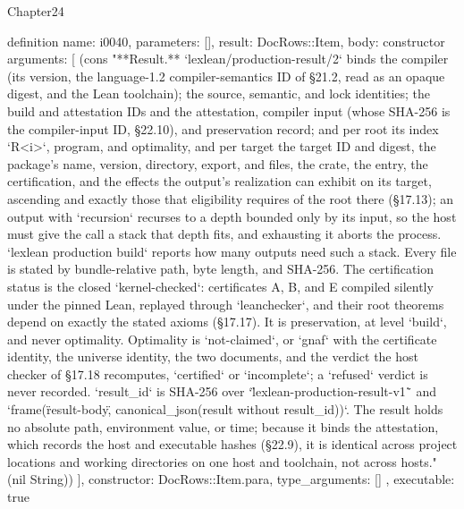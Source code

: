 \begin{lexlean}{Chapter24}
\begin{semanticmodule}
definition{
  name: i0040,
  parameters: [],
  result: DocRows::Item,
  body: constructor{
    arguments: [
      (cons "**Result.** `lexlean/production-result/2` binds the compiler (its version, the language-1.2 compiler-semantics ID of §21.2, read as an opaque digest, and the Lean toolchain); the source, semantic, and lock identities; the build and attestation IDs and the attestation, compiler input (whose SHA-256 is the compiler-input ID, §22.10), and preservation record; and per root its index `R<i>`, program, and optimality, and per target the target ID and digest, the package's name, version, directory, export, and files, the crate, the entry, the certification, and the effects the output's realization can exhibit on its target, ascending and exactly those that eligibility requires of the root there (§17.13); an output with `recursion` recurses to a depth bounded only by its input, so the host must give the call a stack that depth fits, and exhausting it aborts the process. `lexlean production build` reports how many outputs need such a stack. Every file is stated by bundle-relative path, byte length, and SHA-256. The certification status is the closed `kernel-checked`: certificates A, B, and E compiled silently under the pinned Lean, replayed through `leanchecker`, and their root theorems depend on exactly the stated axioms (§17.17). It is preservation, at level `build`, and never optimality. Optimality is `not-claimed`, or `gnaf` with the certificate identity, the universe identity, the two documents, and the verdict the host checker of §17.18 recomputes, `certified` or `incomplete`; a `refused` verdict is never recorded. `result_id` is SHA-256 over `\"lexlean-production-result-v1\"` and `frame(\"result-body\", canonical_json(result without result_id))`. The result holds no absolute path, environment value, or time; because it binds the attestation, which records the host and executable hashes (§22.9), it is identical across project locations and working directories on one host and toolchain, not across hosts." (nil String))
    ],
    constructor: DocRows::Item.para,
    type_arguments: []
  },
  executable: true
}


\end{semanticmodule}
\end{lexlean}
